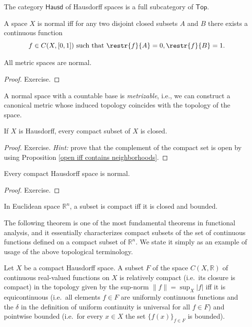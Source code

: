 \documentclass[english,letterpaper]{article}%
\numberwithin{equation}{section}
\numberwithin{figure}{section}
\numberwithin{table}{section}
\theoremstyle{definition}
\theoremstyle{definition}
\theoremstyle{definition}
\theoremstyle{plain}
\theoremstyle{plain}
\theoremstyle{plain}
\theoremstyle{plain}
\theoremstyle{remark}
\theoremstyle{remark}
\begin{document}
\begin{example}
The category $\mathsf{Hausd}$ of Hausdorff spaces is a full subcategory of $\mathsf{Top}$.
\end{example}

\begin{thm}
A space $X$ is normal iff for any two disjoint closed subsets $A$ and $B$ there exists a continuous function
\begin{equation}
f\in C(X,[0,1]) ~\text{such that}~ \restr{f}{A} = 0, \restr{f}{B} = 1.
\end{equation}
\end{thm}

\begin{thm}
All metric spaces are normal.
\end{thm}
\begin{proof}
Exercise.
\end{proof}

\begin{thm}[Urysohn]
A normal space with a countable base is \emph{metrizable}, i.e., we can construct a canonical metric whose induced topology coincides with the topology of the space.
\end{thm}

\begin{prop}
If $X$ is Hausdorff, every compact subset of $X$ is closed.
\end{prop}
\begin{proof}
Exercise. \emph{Hint:} prove that the complement of the compact set is open by using Proposition \ref{open iff contains neighborhoods}.
\end{proof}

\begin{prop}
Every compact Hausdorff space is normal.
\end{prop}
\begin{proof}
Exercise.
\end{proof}

\begin{thm}
In Euclidean space $\mathbb{R}^n$, a subset is compact iff it is closed and bounded.
\end{thm}

The following theorem is one of the most fundamental theorems in functional analysis, and it essentially characterizes compact subsets of the set of continuous functions defined on a compact subset of $\mathbb{R}^n$. We state it simply as an example of usage of the above topological terminology.
\begin{thm}
Let $X$ be a compact Hausdorff space. A subset $F$ of the space $C(X,\mathbb{R})$ of continuous real-valued functions on $X$ is relatively compact (i.e.\ its closure is compact) in the topology given by the sup-norm $\lVert f\rVert=\sup_X \vert f\rvert$ iff it is equicontinuous (i.e.\ all elements $f\in F$ are uniformly continuous functions and the $\delta$ in the definition of uniform continuity is universal for all $f\in F$) and pointwise bounded (i.e.\ for every $x\in X$ the set $\{f(x)\}_{f\in F}$ is bounded).
\end{thm}
\end{document}
